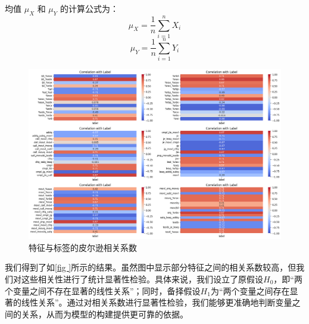 均值 \(\mu_X\) 和 \(\mu_Y\) 的计算公式为：
\begin{equation}
\mu_X = \frac{1}{n} \sum_{i=1}^{n} X_i
\label{eq:mean_x}
\end{equation}
\begin{equation}
\mu_Y = \frac{1}{n} \sum_{i=1}^{n} Y_i
\label{eq:mean_y}
\end{equation}

  \begin{figure}[H]
      \centering
      \includegraphics[width=1\linewidth]{figures/corr.png}
      \caption{特征与标签的皮尔逊相关系数}
      \label{fig:corr}
  \end{figure}
我们得到了如\autoref{fig
}所示的结果。虽然图中显示部分特征之间的相关系数较高，但我们对这些相关性进行了统计显著性检验。具体来说，我们设立了原假设$H_0$，即“两个变量之间不存在显著的线性关系”；同时，备择假设$H_1$为“两个变量之间存在显著的线性关系”。通过对相关系数进行显著性检验，我们能够更准确地判断变量之间的关系，从而为模型的构建提供更可靠的依据。

